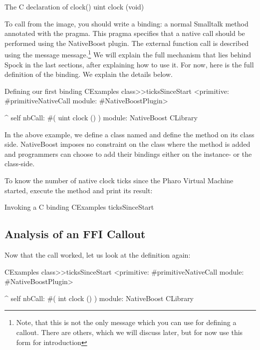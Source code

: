 \documentclass[a4paper,10pt,twoside]{book}
\begin{document}
\begin{script}{The C declaration of clock()}
uint clock (void)
\end{script}

To call  from the image, you should write a binding: a
normal Smalltalk method annotated with the 
pragma. This pragma specifies that a native call should be performed
using the NativeBoost plugin. The external function call is described
using the message  message.\footnote{Note, that
  this is not the only message which you can use for defining a
  callout. There are others, which we will discuss later, but for now
  use this form for introduction} We will explain the full mechanism
that lies behind Spock in the last sections, after explaining how to
use it. For now, here is the full definition of the binding. We
explain the details below.

\begin{script}{Defining our first binding}
CExamples class>>ticksSinceStart
  <primitive: #primitiveNativeCall module: #NativeBoostPlugin>

  ^ self nbCall: #( uint clock () ) module: NativeBoost CLibrary
\end{script}

In the above example, we define a class named  and
define the method on its class side. NativeBoost imposes no constraint
on the class where the method is added and programmers can choose to
add their bindings either on the instance- or the class-side.

To know the number of native clock ticks since the Pharo Virtual
Machine started, execute the method and print its result:

\begin{script}{Invoking a C binding}
CExamples ticksSinceStart
\end{script}


\subsection{Analysis of an FFI Callout}
Now that the call worked, let us look at the definition again:

\begin{code}{}
CExamples class>>ticksSinceStart
	<primitive: #primitiveNativeCall module: #NativeBoostPlugin>
	
	^ self nbCall: #( int clock () ) module: NativeBoost CLibrary
\end{code}
\end{document}
